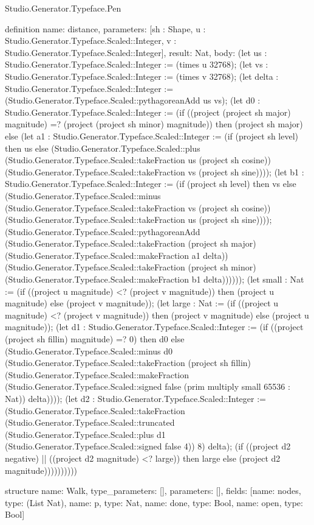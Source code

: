 \begin{lexlean}{Studio.Generator.Typeface.Pen}
\begin{semanticmodule}
definition{
  name: distance,
  parameters: [sh : Shape, u : Studio.Generator.Typeface.Scaled::Integer, v : Studio.Generator.Typeface.Scaled::Integer],
  result: Nat,
  body: (let us : Studio.Generator.Typeface.Scaled::Integer := (times u 32768); (let vs : Studio.Generator.Typeface.Scaled::Integer := (times v 32768); (let delta : Studio.Generator.Typeface.Scaled::Integer := (Studio.Generator.Typeface.Scaled::pythagoreanAdd us vs); (let d0 : Studio.Generator.Typeface.Scaled::Integer := (if ((project (project sh major) magnitude) =? (project (project sh minor) magnitude)) then (project sh major) else (let a1 : Studio.Generator.Typeface.Scaled::Integer := (if (project sh level) then us else (Studio.Generator.Typeface.Scaled::plus (Studio.Generator.Typeface.Scaled::takeFraction us (project sh cosine)) (Studio.Generator.Typeface.Scaled::takeFraction vs (project sh sine)))); (let b1 : Studio.Generator.Typeface.Scaled::Integer := (if (project sh level) then vs else (Studio.Generator.Typeface.Scaled::minus (Studio.Generator.Typeface.Scaled::takeFraction vs (project sh cosine)) (Studio.Generator.Typeface.Scaled::takeFraction us (project sh sine)))); (Studio.Generator.Typeface.Scaled::pythagoreanAdd (Studio.Generator.Typeface.Scaled::takeFraction (project sh major) (Studio.Generator.Typeface.Scaled::makeFraction a1 delta)) (Studio.Generator.Typeface.Scaled::takeFraction (project sh minor) (Studio.Generator.Typeface.Scaled::makeFraction b1 delta)))))); (let small : Nat := (if ((project u magnitude) <? (project v magnitude)) then (project u magnitude) else (project v magnitude)); (let large : Nat := (if ((project u magnitude) <? (project v magnitude)) then (project v magnitude) else (project u magnitude)); (let d1 : Studio.Generator.Typeface.Scaled::Integer := (if ((project (project sh fillin) magnitude) =? 0) then d0 else (Studio.Generator.Typeface.Scaled::minus d0 (Studio.Generator.Typeface.Scaled::takeFraction (project sh fillin) (Studio.Generator.Typeface.Scaled::makeFraction (Studio.Generator.Typeface.Scaled::signed false (prim multiply small 65536 : Nat)) delta)))); (let d2 : Studio.Generator.Typeface.Scaled::Integer := (Studio.Generator.Typeface.Scaled::takeFraction (Studio.Generator.Typeface.Scaled::truncated (Studio.Generator.Typeface.Scaled::plus d1 (Studio.Generator.Typeface.Scaled::signed false 4)) 8) delta); (if ((project d2 negative) || ((project d2 magnitude) <? large)) then large else (project d2 magnitude))))))))))
}

structure{
  name: Walk,
  type_parameters: [],
  parameters: [],
  fields: [{name: nodes, type: (List Nat)}, {name: p, type: Nat}, {name: done, type: Bool}, {name: open, type: Bool}]
}


\end{semanticmodule}
\end{lexlean}
